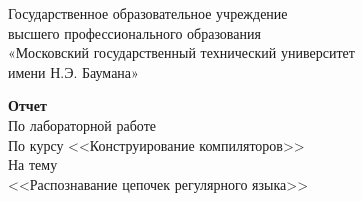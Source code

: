 \begin{titlepage}
	
	
	\thispagestyle{empty}
	
	\begin{figure}[t]
	\end{figure}
	\begin{center}
	Государственное образовательное учреждение\\
	высшего профессионального образования\\
 	«Московский государственный технический университет\\
 	имени Н.Э. Баумана»
	\end{center}
	
	\vspace{5cm}
	
	\begin{center}
		\textbf {Отчет}\\
		По лабораторной работе \\
		По курсу <<Конструирование компиляторов>>\\
		На тему\\
		<<Распознавание цепочек регулярного языка>>\\
	\end{center}

	\vspace{8cm}
	

\end{titlepage}